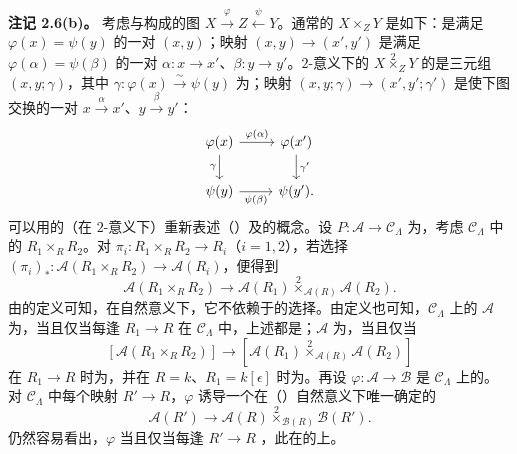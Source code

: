 \textbf{注记 2.6(b)。} 考虑与构成的图 $X\xrightarrow\varphi Z\xleftarrow\psi Y$。通常的 $X\times_ZY$ 是如下：是满足 $\varphi(x)=\psi(y)$ 的一对 $(x,y)$；映射 $(x,y)\to(x',y')$ 是满足 $\varphi(\alpha)=\psi(\beta)$ 的一对 $\alpha:x\to x'$、$\beta:y\to y'$。$2$-意义下的 $X\mathbin{\overset{2}{\times}}_ZY$ 的是三元组 $(x,y;\gamma)$，其中 $\gamma:\varphi(x)\xrightarrow\sim\psi(y)$ 为；映射 $(x,y;\gamma)\to(x',y';\gamma')$ 是使下图交换的一对 $x\xrightarrow\alpha x'$、$y\xrightarrow\beta y'$：
\[
\begin{tikzcd}
\varphi(x)\arrow[r,"\varphi(\alpha)"]\arrow[d,"\gamma"']&\varphi(x')\arrow[d,"\gamma'"]\\
\psi(y)\arrow[r,"\psi(\beta)"']&\psi(y').
\end{tikzcd}
\]
可以用的（在 $2$-意义下）重新表述（）及的概念。设 $P:\mathcal A\to\mathcal C_\Lambda$ 为，考虑 $\mathcal C_\Lambda$ 中的 $R_1\times_RR_2$。对 $\pi_i:R_1\times_RR_2\to R_i$（$i=1,2$），若选择 $(\pi_i)_*:\mathcal A(R_1\times_RR_2)\to\mathcal A(R_i)$，便得到
\[\mathcal A(R_1\times_RR_2)\longrightarrow\mathcal A(R_1)\mathbin{\overset{2}{\times}}_{\mathcal A(R)}\mathcal A(R_2).\]
由的定义可知，在自然意义下，它不依赖于的选择。由定义也可知，$\mathcal C_\Lambda$ 上的 $\mathcal A$ 为，当且仅当每逢 $R_1\to R$ 在 $\mathcal C_\Lambda$ 中，上述都是；$\mathcal A$ 为，当且仅当
\[ [\mathcal A(R_1\times_RR_2)]\longrightarrow
[\mathcal A(R_1)\mathbin{\overset{2}{\times}}_{\mathcal A(R)}\mathcal A(R_2)]\]
在 $R_1\to R$ 时为，并在 $R=k$、$R_1=k[\epsilon]$ 时为。再设 $\varphi:\mathcal A\to\mathcal B$ 是 $\mathcal C_\Lambda$ 上的。对 $\mathcal C_\Lambda$ 中每个映射 $R'\to R$，$\varphi$ 诱导一个在（）自然意义下唯一确定的
\[\mathcal A(R')\longrightarrow\mathcal A(R)\mathbin{\overset{2}{\times}}_{\mathcal B(R)}\mathcal B(R').\]
仍然容易看出，$\varphi$ 当且仅当每逢 $R'\to R$ ，此在的上。

